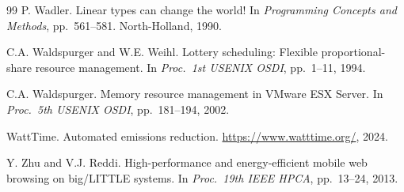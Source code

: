 \documentclass[11pt,a4paper]{article}
\begin{document}
\begin{thebibliography}{99}
P. Wadler.
\newblock Linear types can change the world!
\newblock In \emph{Programming Concepts and Methods}, pp.\ 561--581.
  North-Holland, 1990.

C.A. Waldspurger and W.E. Weihl.
\newblock Lottery scheduling: Flexible proportional-share resource management.
\newblock In \emph{Proc.\ 1st USENIX OSDI}, pp.\ 1--11, 1994.

C.A. Waldspurger.
\newblock Memory resource management in VMware ESX Server.
\newblock In \emph{Proc.\ 5th USENIX OSDI}, pp.\ 181--194, 2002.

WattTime.
\newblock Automated emissions reduction.
\newblock \url{https://www.watttime.org/}, 2024.

Y. Zhu and V.J. Reddi.
\newblock High-performance and energy-efficient mobile web browsing on big/LITTLE
  systems.
\newblock In \emph{Proc.\ 19th IEEE HPCA}, pp.\ 13--24, 2013.

\end{thebibliography}
\end{document}
